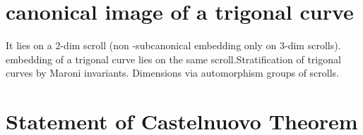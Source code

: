 \section{ canonical image of a trigonal curve}
It lies on a 2-dim scroll (non -subcanonical embedding only on 3-dim scrolls).  embedding of a trigonal curve lies on the same scroll.Stratification of trigonal curves by Maroni invariants. Dimensions via automorphism groups of scrolls.
 
\section{ Statement of Castelnuovo Theorem}




